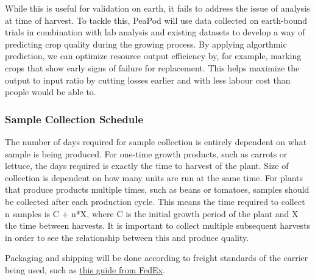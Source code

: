 While this is useful for validation on earth, it fails to address the issue of analysis at time of harvest. To tackle this, PeaPod will use data collected on earth-bound trials in combination with lab analysis and existing datasets to develop a way of predicting crop quality during the growing process. By applying algorthmic prediction, we can optimize resource output efficiency by, for example, marking crops that show early signs of failure for replacement. This helps maximize the output to input ratio by cutting losses earlier and with less labour cost than people would be able to.



\subsubsection{Sample Collection Schedule}

The number of days required for sample collection is entirely dependent on what sample is being produced. For one-time growth products, such as carrots or lettuce, the days required is exactly the time to harvest of the plant. Size of collection is dependent on how many units are run at the same time. For plants that produce products multiple times, such as beans or tomatoes, samples should be collected after each production cycle. This means the time required to collect n samples is C + n*X, where C is the initial growth period of the plant and X the time between harvests. It is important to collect multiple subsequent harvests in order to see the relationship between this and produce quality.

Packaging and shipping will be done according to freight standards of the carrier being used, such as \href{https://www.fedex.com/en-us/shipping/how-to-ship-perishables.html#1}{this guide from FedEx}. 



\clearpage

